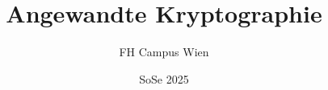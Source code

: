 \documentclass{book}
\begin{document}
\frontmatter

\title{Angewandte Kryptographie}
\author{FH Campus Wien}
\date{SoSe 2025}

\maketitle
\tableofcontents

\mainmatter










\backmatter

% 
% 
\printindex
\end{document}
